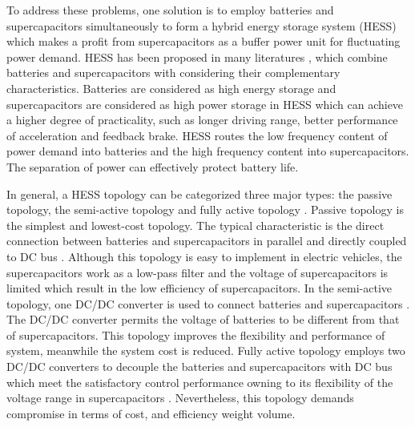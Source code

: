 \documentclass[energies,article,submit,moreauthors,pdftex,10pt,a4paper]{Definitions/mdpi}
\begin{document}
To address these problems, one solution is to employ batteries and supercapacitors simultaneously to form a hybrid energy storage system (HESS) which makes a profit from supercapacitors as a buffer power unit for fluctuating power demand. HESS has been proposed in many literatures \cite{IEEEhowto:intro4, IEEEhowto:intro5,  IEEEhowto:intro6}, which combine batteries and supercapacitors with considering their complementary characteristics. Batteries are considered as high energy storage and supercapacitors are considered as high power storage in HESS which can achieve a higher degree of practicality, such as longer driving range, better performance of acceleration and feedback brake. HESS routes the low frequency content of power demand into batteries and the high frequency content into supercapacitors. The separation of power can effectively protect battery life.

In general, a HESS topology can be categorized three major types: the passive topology, the semi-active topology and fully active topology \cite{IEEEhowto:intro7}. Passive topology is the simplest and lowest-cost topology. The typical characteristic is the direct connection between batteries and supercapacitors in parallel and directly coupled to DC bus \cite{IEEEhowto:intro8, IEEEhowto:intro9,IEEEhowto:intro10}. Although this topology is easy to implement in electric vehicles, the supercapacitors work as a low-pass filter and the voltage of supercapacitors is limited which result in the low efficiency of supercapacitors.
In the semi-active topology, one DC/DC converter is used to connect batteries and supercapacitors \cite{IEEEhowto:intro14, IEEEhowto:intro15}. The DC/DC converter permits the voltage of batteries to be different from that of supercapacitors.  This topology improves the flexibility and performance of system, meanwhile the system cost is reduced.
Fully active topology employs two DC/DC converters to decouple the batteries and supercapacitors with DC bus which meet the satisfactory control performance owning to its flexibility of the voltage range in supercapacitors \cite{IEEEhowto:intro11, IEEEhowto:intro12, IEEEhowto:intro13}. Nevertheless, this topology demands compromise in terms of cost, and efficiency weight volume.
\end{document}
